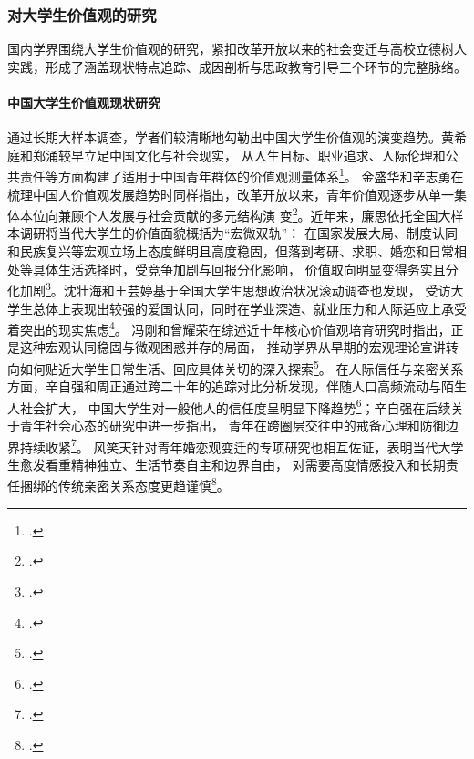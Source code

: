 \subsubsection{对大学生价值观的研究}

国内学界围绕大学生价值观的研究，紧扣改革开放以来的社会变迁与高校立德树人实践，形成了涵盖现状特点追踪、成因剖析与思政教育引导三个环节的完整脉络。

\paragraph{中国大学生价值观现状研究}
通过长期大样本调查，学者们较清晰地勾勒出中国大学生价值观的演变趋势。黄希庭和郑涌较早立足中国文化与社会现实，
从人生目标、职业追求、人际伦理和公共责任等方面构建了适用于中国青年群体的价值观测量体系\footcite{Huang2005}。
金盛华和辛志勇在梳理中国人价值观发展趋势时同样指出，改革开放以来，青年价值观逐步从单一集体本位向兼顾个人发展与社会贡献的多元结构演
变\footcite{BJSF200303008}。近年来，廉思依托全国大样本调研将当代大学生的价值面貌概括为“宏微双轨”：
在国家发展大局、制度认同和民族复兴等宏观立场上态度鲜明且高度稳固，但落到考研、求职、婚恋和日常相处等具体生活选择时，受竞争加剧与回报分化影响，
价值取向明显变得务实且分化加剧\footcite{Lian2024b}。沈壮海和王芸婷基于全国大学生思想政治状况滚动调查也发现，
受访大学生总体上表现出较强的爱国认同，同时在学业深造、就业压力和人际适应上承受着突出的现实焦虑\footcite{Shen2022}。
冯刚和曾耀荣在综述近十年核心价值观培育研究时指出，正是这种宏观认同稳固与微观困惑并存的局面，
推动学界从早期的宏观理论宣讲转向如何贴近大学生日常生活、回应具体关切的深入探索\footcite{Feng2022}。
在人际信任与亲密关系方面，辛自强和周正通过跨二十年的追踪对比分析发现，伴随人口高频流动与陌生人社会扩大，
中国大学生对一般他人的信任度呈明显下降趋势\footcite{XLXD201203004}；辛自强在后续关于青年社会心态的研究中进一步指出，
青年在跨圈层交往中的戒备心理和防御边界持续收紧\footcite{Xin2020}。
风笑天针对青年婚恋观变迁的专项研究也相互佐证，表明当代大学生愈发看重精神独立、生活节奏自主和边界自由，
对需要高度情感投入和长期责任捆绑的传统亲密关系态度更趋谨慎\footcite{FengXiaotian2018}。

